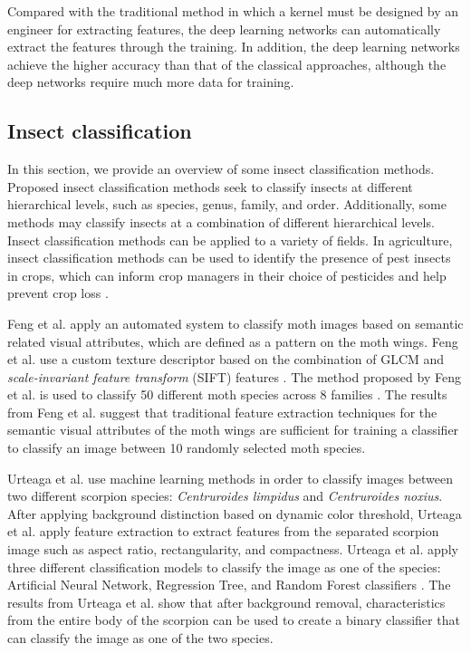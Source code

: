 \documentclass{aci}
\numberwithin{equation}{section}
\begin{document}
Compared with the traditional method in which a kernel must be designed by an
engineer for extracting features, the deep learning networks can automatically
extract the features through the training. In addition, the deep learning
networks achieve the higher accuracy than that of the classical approaches,
although the deep networks require much more data for training.

\subsection{Insect classification}
In this section, we provide an overview of some insect classification methods.
Proposed insect classification methods seek to classify insects at different
hierarchical levels, such as species, genus, family, and order. Additionally,
some methods may classify insects at a combination of different hierarchical
levels. Insect classification methods can be applied to a variety of fields. In
agriculture, insect classification methods can be used to identify the presence
of pest insects in crops, which can inform crop managers in their choice of
pesticides and help prevent crop loss \cite{liu_pestnet_2019,
    kasinathan_machine_2021}.

Feng et al. \cite{feng_automated_2013} apply an automated system to classify
moth images based on semantic related visual attributes, which are defined as a
pattern on the moth wings. Feng et al. \cite{feng_automated_2013} use a custom
texture descriptor based on the combination of GLCM and \textit{scale-invariant
    feature transform} (SIFT) features \cite{gotlieb_texture_1990,
    lowe_distinctive_2004}. The method proposed by Feng et al.
\cite{feng_automated_2013} is used to classify 50 different moth species across
8 families \cite{feng_automated_2013}. The results from Feng et al.
\cite{feng_automated_2013} suggest that traditional feature extraction
techniques for the semantic visual attributes of the moth wings are sufficient
for training a classifier to classify an image between 10 randomly selected moth
species.

Urteaga et al. \cite{urteaga_scorpions_2016} use machine learning methods in
order to classify images between two different scorpion species:
\textit{Centruroides limpidus} and \textit{Centruroides noxius}. After applying
background distinction based on dynamic color threshold, Urteaga et al.
\cite{urteaga_scorpions_2016} apply feature extraction to extract features from
the separated scorpion image such as aspect ratio, rectangularity, and
compactness. Urteaga et al. \cite{urteaga_scorpions_2016} apply three different
classification models to classify the image as one of the species: Artificial
Neural Network, Regression Tree, and Random Forest classifiers
\cite{urteaga_scorpions_2016}. The results from Urteaga et al.
\cite{urteaga_scorpions_2016} show that after background removal,
characteristics from the entire body of the scorpion can be used to create a
binary classifier that can classify the image as one of the two species.
\end{document}
